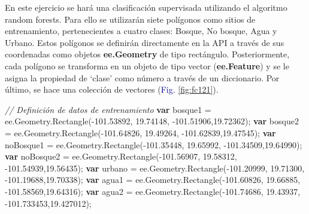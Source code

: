 \documentclass[
  12pt,
  letterpaper,
  twoside]{book}
\newenvironment{Shaded}{\begin{snugshade}}{\end{snugshade}}
\newcommand{\AttributeTok}[1]{\textcolor[rgb]{0.48,0.12,0.64}{#1}}
\newcommand{\CommentTok}[1]{\textcolor[rgb]{0.24,0.58,0.00}{\textit{#1}}}
\newcommand{\FloatTok}[1]{\textcolor[rgb]{0.28,0.53,0.93}{#1}}
\newcommand{\FunctionTok}[1]{\textcolor[rgb]{0.48,0.12,0.64}{#1}}
\newcommand{\KeywordTok}[1]{\textcolor[rgb]{0.00,0.00,0.00}{\textbf{#1}}}
\newcommand{\NormalTok}[1]{#1}
\newcommand{\OperatorTok}[1]{\textcolor[rgb]{0.00,0.00,0.00}{#1}}
\newcommand\boldpurple[1]{\textcolor{darkpurple}{\textbf{#1}}}
\begin{document}
En este ejercicio se hará una clasificación supervisada utilizando el algoritmo random forests. Para ello se utilizarán siete polígonos como sitios de entrenamiento, pertenecientes a cuatro clases: Bosque, No bosque, Agua y Urbano. Estos polígonos se definirán directamente en la API a través de sus coordenadas como objetos \boldpurple{ee.Geometry} de tipo rectángulo. Posteriormente, cada polígono se transforma en un objeto de tipo vector (\boldpurple{ee.Feature}) y se le asigna la propiedad de `clase' como número a través de un diccionario. Por último, se hace una colección de vectores (\textcolor{darkblue}{Fig.} \ref{fig:fc121}).

\begin{Shaded}
\begin{Highlighting}[]
\CommentTok{// Definición de datos de entrenamiento}
\KeywordTok{var}\NormalTok{ bosque1 }\OperatorTok{=}\NormalTok{ ee}\OperatorTok{.}\AttributeTok{Geometry}\OperatorTok{.}\FunctionTok{Rectangle}\NormalTok{(}\OperatorTok{{-}}\FloatTok{101.53892}\OperatorTok{,} \FloatTok{19.74148}\OperatorTok{,} 
  \OperatorTok{{-}}\FloatTok{101.51906}\OperatorTok{,}\FloatTok{19.72362}\NormalTok{)}\OperatorTok{;}
\KeywordTok{var}\NormalTok{ bosque2 }\OperatorTok{=}\NormalTok{ ee}\OperatorTok{.}\AttributeTok{Geometry}\OperatorTok{.}\FunctionTok{Rectangle}\NormalTok{(}\OperatorTok{{-}}\FloatTok{101.64826}\OperatorTok{,} \FloatTok{19.49264}\OperatorTok{,} 
  \OperatorTok{{-}}\FloatTok{101.62839}\OperatorTok{,}\FloatTok{19.47545}\NormalTok{)}\OperatorTok{;}
\KeywordTok{var}\NormalTok{ noBosque1 }\OperatorTok{=}\NormalTok{ ee}\OperatorTok{.}\AttributeTok{Geometry}\OperatorTok{.}\FunctionTok{Rectangle}\NormalTok{(}\OperatorTok{{-}}\FloatTok{101.35448}\OperatorTok{,} \FloatTok{19.65992}\OperatorTok{,} 
  \OperatorTok{{-}}\FloatTok{101.34509}\OperatorTok{,}\FloatTok{19.64990}\NormalTok{)}\OperatorTok{;}
\KeywordTok{var}\NormalTok{ noBosque2 }\OperatorTok{=}\NormalTok{ ee}\OperatorTok{.}\AttributeTok{Geometry}\OperatorTok{.}\FunctionTok{Rectangle}\NormalTok{(}\OperatorTok{{-}}\FloatTok{101.56907}\OperatorTok{,} \FloatTok{19.58312}\OperatorTok{,} 
  \OperatorTok{{-}}\FloatTok{101.54939}\OperatorTok{,}\FloatTok{19.56435}\NormalTok{)}\OperatorTok{;}
\KeywordTok{var}\NormalTok{ urbano }\OperatorTok{=}\NormalTok{ ee}\OperatorTok{.}\AttributeTok{Geometry}\OperatorTok{.}\FunctionTok{Rectangle}\NormalTok{(}\OperatorTok{{-}}\FloatTok{101.20999}\OperatorTok{,} \FloatTok{19.71300}\OperatorTok{,} 
  \OperatorTok{{-}}\FloatTok{101.19688}\OperatorTok{,}\FloatTok{19.70338}\NormalTok{)}\OperatorTok{;}
\KeywordTok{var}\NormalTok{ agua1 }\OperatorTok{=}\NormalTok{ ee}\OperatorTok{.}\AttributeTok{Geometry}\OperatorTok{.}\FunctionTok{Rectangle}\NormalTok{(}\OperatorTok{{-}}\FloatTok{101.60826}\OperatorTok{,} \FloatTok{19.66885}\OperatorTok{,} 
  \OperatorTok{{-}}\FloatTok{101.58569}\OperatorTok{,}\FloatTok{19.64316}\NormalTok{)}\OperatorTok{;}
\KeywordTok{var}\NormalTok{ agua2 }\OperatorTok{=}\NormalTok{ ee}\OperatorTok{.}\AttributeTok{Geometry}\OperatorTok{.}\FunctionTok{Rectangle}\NormalTok{(}\OperatorTok{{-}}\FloatTok{101.74686}\OperatorTok{,} \FloatTok{19.43937}\OperatorTok{,} 
  \OperatorTok{{-}}\FloatTok{101.733453}\OperatorTok{,}\FloatTok{19.427012}\NormalTok{)}\OperatorTok{;}


\end{Highlighting}
\end{Shaded}
\end{document}
